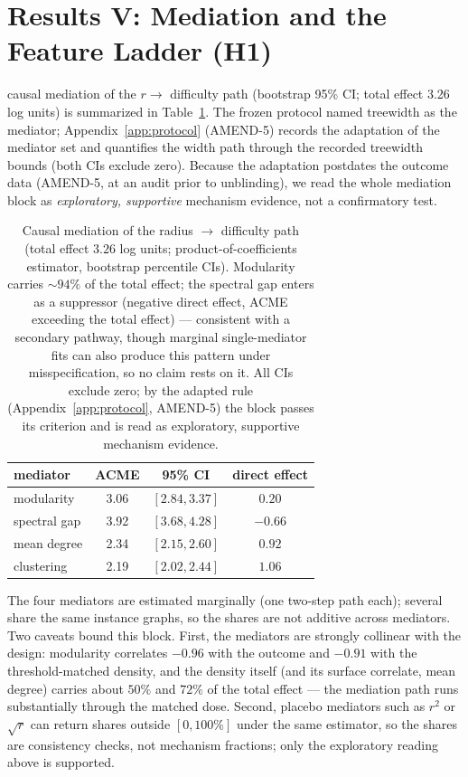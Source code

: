 \documentclass[pdflatex,sn-basic,Numbered]{sn-jnl}
\begin{document}
\section{Results V: Mediation and the Feature Ladder (H1)}
\label{sec:mediation}

\citet{imai2011} causal mediation of the $r \to$ difficulty path (bootstrap
95\% CI; total effect 3.26 log units) is summarized in
Table~\ref{tab:mediation}. The frozen protocol named treewidth as the
mediator; Appendix~\ref{app:protocol} (AMEND-5) records the adaptation of
the mediator set and quantifies the width path through the recorded
treewidth bounds (both CIs exclude zero). Because the adaptation postdates
the outcome data (AMEND-5, at an audit prior to unblinding), we read the
whole mediation block as \emph{exploratory, supportive} mechanism evidence,
not a confirmatory test.

\begin{table}[h]
\centering
\caption{Causal mediation of the radius $\to$ difficulty path (total effect
$3.26$ log units; product-of-coefficients estimator, bootstrap percentile
CIs). Modularity carries ${\sim}94\%$ of the total effect; the spectral gap
enters as a suppressor (negative direct effect, ACME exceeding the total
effect) --- consistent with a secondary pathway, though marginal
single-mediator fits can also produce this pattern under misspecification,
so no claim rests on it. All CIs exclude zero; by the adapted rule
(Appendix~\ref{app:protocol}, AMEND-5) the block passes its criterion and is
read as exploratory, supportive mechanism evidence.}
\begin{tabular}{lccc}
\toprule
mediator & ACME & 95\% CI & direct effect\\
\midrule
modularity & 3.06 & $[2.84, 3.37]$ & $0.20$\\
spectral gap & 3.92 & $[3.68, 4.28]$ & $-0.66$\\
mean degree & 2.34 & $[2.15, 2.60]$ & $0.92$\\
clustering & 2.19 & $[2.02, 2.44]$ & $1.06$\\
\bottomrule
\end{tabular}

\label{tab:mediation}
\end{table}

The four mediators are estimated marginally (one two-step path each); several
share the same instance graphs, so the shares are not additive across
mediators. Two caveats bound this block. First, the mediators are strongly
collinear with the design: modularity correlates $-0.96$ with the outcome and
$-0.91$ with the threshold-matched density, and the density itself (and its
surface correlate, mean degree) carries about $50\%$ and $72\%$ of the total
effect --- the mediation path runs substantially through the matched dose.
Second, placebo mediators such as $r^2$ or $\sqrt r$ can return shares
outside $[0,100\%]$ under the same estimator, so the shares are consistency
checks, not mechanism fractions; only the exploratory reading above is
supported.
\end{document}
